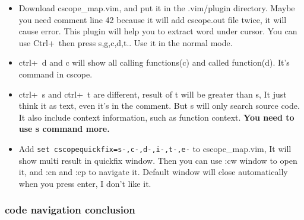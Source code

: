 \documentclass[a4paper,12pt,twoside]{book}
\begin{document}
\begin{itemize}
\item Download cscope\_map.vim, and put it in the .vim/plugin directory. Maybe you need comment line 42 because it will add cscope.out file twice, it will cause error. This plugin will help you to extract word under cursor. You can use Ctrl+\ then press s,g,c,d,t.. Use it in the normal mode. 

\item ctrl+\ d and c will show all calling functions(c) and called function(d). It's command in cscope.

		\item ctrl+\ s and ctrl+\ t are different, result of t will be greater than s, It just think it as text, even it's in the comment. But s will only search source code. It also include context information, such as function context. \textbf{You need to use s command more.}


\item Add \verb!set cscopequickfix=s-,c-,d-,i-,t-,e-! to cscope\_map.vim, It will show multi result in quickfix window. Then you can use :cw window to open it, and :cn and :cp to navigate it. Default window will close automatically when you press enter, I don't like it. 
\end{itemize}

\subsubsection{code navigation conclusion}
\end{document}
